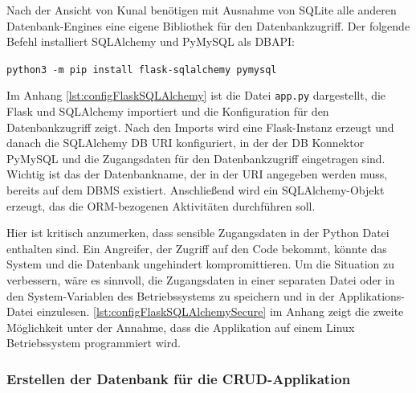 \documentclass[a4paper,titlepage,halfparskip,12pt,listof=numbered]{scrreprt}
\begin{document}
\begin{onehalfspacing}
Nach der Ansicht von Kunal \cite[S.31]{pythonFlaskREST} benötigen mit Ausnahme von SQLite alle anderen Datenbank-Engines eine eigene Bibliothek für den Datenbankzugriff. Der folgende Befehl installiert SQLAlchemy und PyMySQL als DBAPI:

\texttt{python3 -m pip install flask-sqlalchemy pymysql}

Im Anhang \autoref{lst:configFlaskSQLAlchemy} ist die Datei \texttt{app.py} dargestellt, die Flask und SQLAlchemy importiert und die Konfiguration für den Datenbankzugriff zeigt. Nach den Imports wird eine Flask-Instanz erzeugt und danach die SQLAlchemy DB \acs{URI} konfiguriert, in der der DB Konnektor PyMySQL und die Zugangsdaten für den Datenbankzugriff eingetragen sind. Wichtig ist das der Datenbankname, der in der \acs{URI} angegeben werden muss, bereits auf dem \ac{DBMS} existiert. Anschließend wird ein SQLAlchemy-Objekt erzeugt, das die \ac{ORM}-bezogenen Aktivitäten durchführen soll.\cite[S.31ff]{pythonFlaskREST}

Hier ist kritisch anzumerken, dass sensible Zugangsdaten in der Python Datei enthalten sind. Ein Angreifer, der Zugriff auf den Code bekommt, könnte das System und die Datenbank ungehindert kompromittieren. Um die Situation zu verbessern, wäre es sinnvoll, die Zugangsdaten in einer separaten Datei oder in den System-Variablen des Betriebssystems zu speichern und in der Applikations-Datei einzulesen. \autoref{lst:configFlaskSQLAlchemySecure} im Anhang zeigt die zweite Möglichkeit unter der Annahme, dass die Applikation auf einem Linux Betriebssystem programmiert wird.

\subsubsection*{Erstellen der Datenbank für die CRUD-Applikation}


\end{onehalfspacing}
\end{document}
